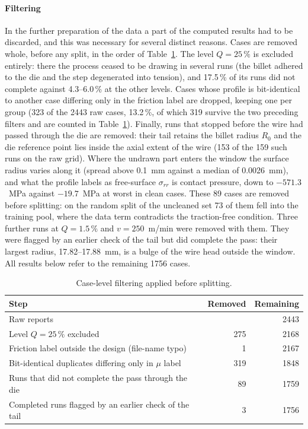 \documentclass[pdflatex,sn-basic,Numbered]{sn-jnl}
\begin{document}
\paragraph{Filtering}
In the further preparation of the data a part of the computed results had to be discarded, and this was necessary for several distinct reasons. Cases are removed whole, before any split, in the order of Table~\ref{tab:filtering}. The level $Q=25\,\%$ is excluded entirely: there the process ceased to be drawing in several runs (the billet adhered to the die and the step degenerated into tension), and 17.5\,\% of its runs did not complete against 4.3--6.0\,\% at the other levels.
Cases whose profile is bit-identical to another case differing only in the friction label are dropped, keeping one per group (323 of the 2443 raw cases, 13.2\,\%, of which 319 survive the two preceding filters and are counted in Table~\ref{tab:filtering}).
Finally, runs that stopped before the wire had passed through the die are removed: their tail retains the billet radius $R_0$ and the die reference point lies inside the axial extent of the wire (153 of the 159 such runs on the raw grid).
Where the undrawn part enters the window the surface radius varies along it (spread above 0.1~mm against a median of 0.0026~mm), and what the profile labels as free-surface $\sigma_{rr}$ is contact pressure, down to $-571.3$~MPa against $-19.7$~MPa at worst in clean cases.
These 89 cases are removed before splitting: on the random split of the uncleaned set 73 of them fell into the training pool, where the data term contradicts the traction-free condition.
Three further runs at $Q=1.5\,\%$ and $v=250$~m/min were removed with them. They were flagged by an earlier check of the tail but did complete the pass: their largest radius, 17.82--17.88~mm, is a bulge of the wire head outside the window. All results below refer to the remaining 1756 cases.

\begin{table}[htbp]
\centering
\caption{Case-level filtering applied before splitting.}
\label{tab:filtering}
\begin{tabular}{@{}lrr@{}}
\toprule
Step & Removed & Remaining \\
\midrule
Raw reports                                            &     & 2443 \\
Level $Q=25\,\%$ excluded                                & 275 & 2168 \\
Friction label outside the design (file-name typo)     & 1   & 2167 \\
Bit-identical duplicates differing only in $\mu$ label & 319 & 1848 \\
Runs that did not complete the pass through the die    & 89  & 1759 \\
Completed runs flagged by an earlier check of the tail & 3   & 1756 \\
\bottomrule
\end{tabular}
\end{table}
\end{document}
